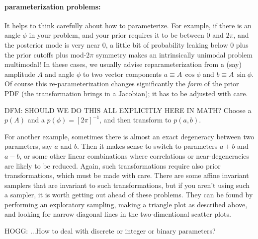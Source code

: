 \documentclass[12pt,twoside,pdftex]{article}
\begin{document}
\paragraph{parameterization problems:}
It helps to think carefully about how to parameterize.
For example, if there is an angle $\phi$ in your problem,
  and your prior requires it to be between $0$ and $2\pi$,
  and the posterior mode is very near $0$,
  a little bit of probability leaking below $0$ plus the prior cutoffs plus mod-$2\pi$ symmetry
  makes an intrinsically unimodal problem multimodal!
In these cases, we usually advise reparameterization from a (say) amplitude $A$ and angle $\phi$
  to two vector components $a\equiv A\,\cos\phi$ and $b\equiv A\,\sin\phi$.
Of course this re-parameterization changes significantly the \emph{form} of the prior PDF
  (the transformation brings in a Jacobian);
  it has to be adjusted with care.

DFM: SHOULD WE DO THIS ALL EXPLICITLY HERE IN MATH?
Choose a $p(A)$ and a $p(\phi) = [2\pi]^{-1}$,
   and then transform to $p(a, b)$.


For another example, sometimes there is almost an exact degeneracy between two parameters,
  say $a$ and $b$.  Then it makes sense to switch to parameters $a+b$ and $a-b$,
  or some other linear combinations where correlations or near-degeneracies are likely to be reduced.
Again, such transformations require also prior transformations, which must be made with care.
There are some affine invariant samplers that are invariant to such transformations,
  but if you aren't using such a sampler,
  it is worth getting out ahead of these problems.
They can be found by performing an exploratory sampling,
  making a triangle plot as described above,
  and looking for narrow diagonal lines in the two-dimentional scatter plots.

HOGG: ...How to deal with discrete or integer or binary parameters?
\end{document}
